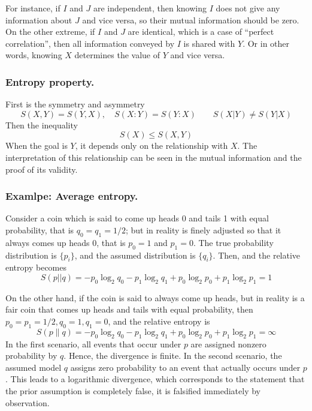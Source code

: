 \documentclass[../../../main.tex]{subfiles}
\begin{document}
For instance, if $I$ and $J$ are independent, then knowing $I$ does not give any information about $J$ and vice versa, so their mutual information should be zero.
On the other extreme, if $I$ and $J$ are identical, which is a case of “perfect correlation”, then all information conveyed by $I$ is shared with $Y$. 
Or in other words, knowing $X$ determines the value of $Y$ and vice versa. 

\subsubsection{Entropy property.}
First is the symmetry and asymmetry
\begin{equation*}
  S(X, Y) = S(Y, X), \quad S(X : Y) = S(Y : X) \qquad S(X|Y) \neq S(Y|X)
\end{equation*}
Then the inequality 
\begin{equation*}
  S(X) \leq S(X,Y)
\end{equation*}
When the goal is \( Y \), it depends only on the relationship with \( X \). 
The interpretation of this relationship can be seen in the mutual information and the proof of its validity.

\subsubsection{Examlpe: Average entropy.}
Consider a coin which is said to come up heads 0 and tails 1 with equal probability, that is $q_0 = q_1 = 1/2$; but in reality is finely adjusted so that it always comes up heads 0, that is $p_0 = 1$ and $ p_1 = 0$.
The true probability distribution is \( \{p_i\} \), and the assumed distribution is \( \{q_i\} \). 
Then, and the relative entropy becomes
\begin{equation*}
  S(p||q) = - p_0 \log_2 q_0 - p_1 \log_2 q_1 + p_0 \log_2 p_0 + p_1 \log_2 p_1 = 1
\end{equation*}

On the other hand, if the coin is said to always come up heads, but in reality is a fair coin that comes up heads and tails with equal probability, then \( p_0 = p_1 = 1/2, q_0 = 1, q_1 = 0 \), and the relative entropy is
\begin{equation*}
  S(p\|q) = - p_0 \log_2 q_0 - p_1 \log_2 q_1 + p_0 \log_2 p_0 + p_1 \log_2 p_1 = \infty
\end{equation*}
In the first scenario, all events that occur under $p$ are assigned nonzero probability by $q$. 
Hence, the divergence is finite.
In the second scenario, the assumed model $q$ assigns zero probability to an event that actually occurs under $p$. 
This leads to a logarithmic divergence, which corresponds to the statement that the prior assumption is completely false, it is falsified immediately by observation.
\end{document}
